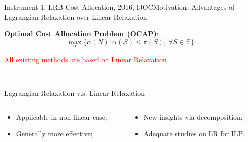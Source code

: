 \documentclass[14pt]{beamer}
\begin{document}
\begin{frame}{Instrument 1: LRB Cost Allocation, {\footnotesize 2016, IJOC}}{Motivation: Advantages of Lagrangian Relaxation over Linear Relaxation}
\vspace{-5mm}
\small
\begin{shaded}
\centering
{\bf Optimal Cost Allocation Problem (OCAP)}:
\begin{equation*}
\max_{\alpha}\big\{ \alpha(N):\alpha(S) \leq \pi(S), ~\forall S \in \mathbb{S} \big\}.
\end{equation*}
\vspace{-2em}
\end{shaded}

\textcolor{red}{\bf \centerline{All existing methods are based on Linear Relaxation}}\\
\vspace{-2mm}
\begin{shaded} 
\centering
Lagrangian Relaxation v.s. Linear Relaxation
\end{shaded}
\vspace{-5mm}
\begin{columns}
\begin{column}{5.5cm}
\begin{itemize}
\footnotesize
\item Applicable in non-linear case;
\item Generally more effective;
\end{itemize}
\end{column}
\begin{column}{8cm}
\begin{itemize}
\footnotesize
\item New insights via decomposition;
\item Adequate studies on LR for ILP.
\end{itemize}
\end{column}
\end{columns}

\end{frame}
\end{document}
